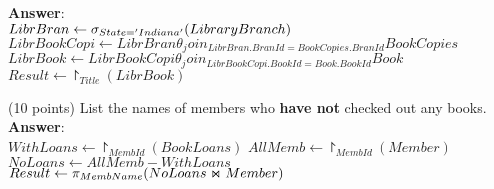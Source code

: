 \begin{questions}
\begin{choices}
	\textbf{Answer}:\\
	$ LibrBran \leftarrow \sigma_{State='Indiana' } (LibraryBranch) $
	$ LibrBookCopi \leftarrow  LibrBran \theta_join_{LibrBran.BranId =BookCopies.BranId } BookCopies $
	$ LibrBook \leftarrow  LibrBookCopi \theta_join_{LibrBookCopi.BookId =Book.BookId } Book $
    $ Result \leftarrow \project_{Title} (LibrBook)$
	
	\choice(10 points) List the names of members who \textbf{have not} checked out any books. \\
	\textbf{Answer}:\\
	$ WithLoans \leftarrow \project_{MembId} (BookLoans)$
	$ AllMemb \leftarrow \project_{MembId} (Member) $
	$ NoLoans \leftarrow AllMemb - WithLoans $
    $ Result \leftarrow \pi_{MembName} (NoLoans \Join Member) $
	
\end{choices}

\end{questions}

